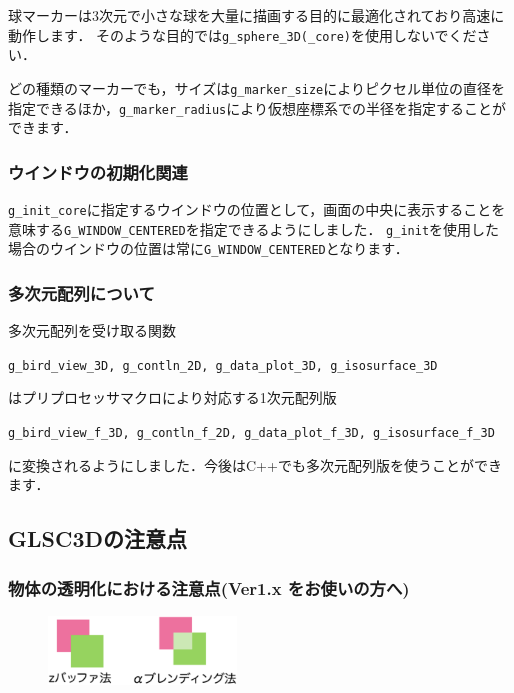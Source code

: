 \documentclass[a4paper,12pt]{jsarticle}%
\begin{document}
球マーカーは3次元で小さな球を大量に描画する目的に最適化されており高速に動作します．
そのような目的では\verb|g_sphere_3D(_core)|を使用しないでください．

どの種類のマーカーでも，サイズは\verb|g_marker_size|によりピクセル単位の直径を指定できるほか，\verb|g_marker_radius|により仮想座標系での半径を指定することができます．

\subsubsection{ウインドウの初期化関連}
\verb|g_init_core|に指定するウインドウの位置として，画面の中央に表示することを意味する\verb|G_WINDOW_CENTERED|を指定できるようにしました．
\verb|g_init|を使用した場合のウインドウの位置は常に\verb|G_WINDOW_CENTERED|となります．

\subsubsection{多次元配列について}
多次元配列を受け取る関数
\begin{center}
	\verb|g_bird_view_3D, g_contln_2D, g_data_plot_3D, g_isosurface_3D|
\end{center}
はプリプロセッサマクロにより対応する1次元配列版
\begin{center}
	\verb|g_bird_view_f_3D, g_contln_f_2D, g_data_plot_f_3D, g_isosurface_f_3D|
\end{center}
に変換されるようにしました．今後はC++でも多次元配列版を使うことができます．

\newpage
\subsection{GLSC3Dの注意点}

\subsubsection{物体の透明化における注意点(Ver1.x をお使いの方へ)}

\begin{figure}
\vspace{-1\baselineskip}
	\includegraphics[width=50mm]{./Figures/eps/004.eps}
\end{figure}
\end{document}
